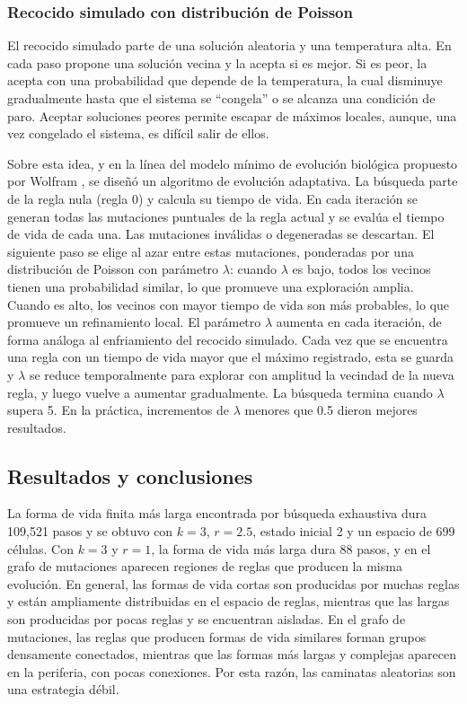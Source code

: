 \subsubsection{Recocido simulado con distribución de Poisson}

El recocido simulado parte de una solución aleatoria y una temperatura alta. En cada paso propone una solución vecina y la acepta si es mejor. Si es peor, la acepta con una probabilidad que depende de la temperatura, la cual disminuye gradualmente hasta que el sistema se ``congela'' o se alcanza una condición de paro. Aceptar soluciones peores permite escapar de máximos locales, aunque, una vez congelado el sistema, es difícil salir de ellos.
	
Sobre esta idea, y en la línea del modelo mínimo de evolución biológica propuesto por Wolfram \cite{wolfram2024evolution}, se diseñó un algoritmo de evolución adaptativa. La búsqueda parte de la regla nula (regla 0) y calcula su tiempo de vida. En cada iteración se generan todas las mutaciones puntuales de la regla actual y se evalúa el tiempo de vida de cada una. Las mutaciones inválidas o degeneradas se descartan. El siguiente paso se elige al azar entre estas mutaciones, ponderadas por una distribución de Poisson con parámetro $\lambda$: cuando $\lambda$ es bajo, todos los vecinos tienen una probabilidad similar, lo que promueve una exploración amplia. Cuando es alto, los vecinos con mayor tiempo de vida son más probables, lo que promueve un refinamiento local. El parámetro $\lambda$ aumenta en cada iteración, de forma análoga al enfriamiento del recocido simulado. Cada vez que se encuentra una regla con un tiempo de vida mayor que el máximo registrado, esta se guarda y $\lambda$ se reduce temporalmente para explorar con amplitud la vecindad de la nueva regla, y luego vuelve a aumentar gradualmente. La búsqueda termina cuando $\lambda$ supera 5. En la práctica, incrementos de $\lambda$ menores que 0.5 dieron mejores resultados.

\subsection{Resultados y conclusiones}

La forma de vida finita más larga encontrada por búsqueda exhaustiva dura 109,521 pasos y se obtuvo con $k = 3$, $r = 2.5$, estado inicial 2 y un espacio de 699 células. Con $k = 3$ y $r = 1$, la forma de vida más larga dura 88 pasos, y en el grafo de mutaciones aparecen regiones de reglas que producen la misma evolución. En general, las formas de vida cortas son producidas por muchas reglas y están ampliamente distribuidas en el espacio de reglas, mientras que las largas son producidas por pocas reglas y se encuentran aisladas. En el grafo de mutaciones, las reglas que producen formas de vida similares forman grupos densamente conectados, mientras que las formas más largas y complejas aparecen en la periferia, con pocas conexiones. Por esta razón, las caminatas aleatorias son una estrategia débil.

